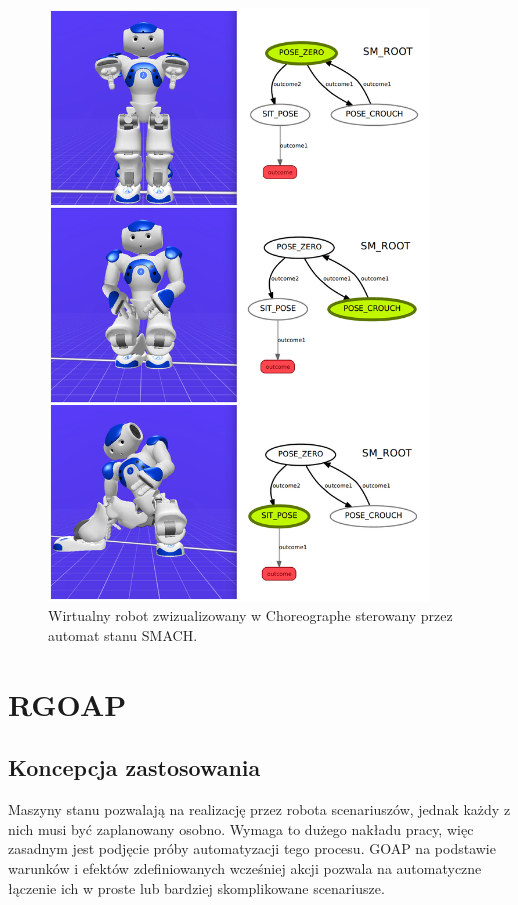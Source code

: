 \begin{figure}
\centering
\includegraphics[width=0.90\textwidth]{images/NaoSmachPoses.png}
\caption{Wirtualny robot zwizualizowany w Choreographe sterowany przez automat stanu SMACH.}
\end{figure}


\section{RGOAP}

\subsection{Koncepcja zastosowania}
Maszyny stanu pozwalają na realizację przez robota scenariuszów, jednak każdy z nich musi być zaplanowany osobno. Wymaga to dużego nakładu pracy, więc zasadnym jest podjęcie próby automatyzacji tego procesu. GOAP na podstawie warunków i efektów zdefiniowanych wcześniej akcji pozwala na automatyczne łączenie ich w proste lub bardziej skomplikowane scenariusze. 

